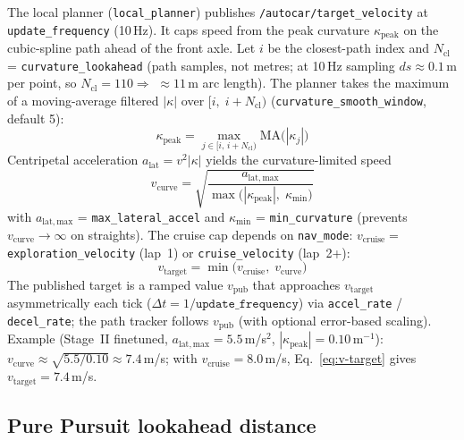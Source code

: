 \documentclass[11pt,a4paper]{article}
\begin{document}
The local planner (\texttt{local\_planner}) publishes
\texttt{/autocar/target\_velocity} at \texttt{update\_frequency} (10\,Hz).
It caps speed from the peak curvature $\kappa_{\mathrm{peak}}$ on the cubic-spline
path ahead of the front axle.
Let $i$ be the closest-path index and $N_{\mathrm{cl}}$ =
\texttt{curvature\_lookahead} (path samples, not metres; at 10\,Hz sampling
$ds \approx 0.1$\,m per point, so $N_{\mathrm{cl}} = 110 \Rightarrow$
${\approx}11$\,m arc length).
The planner takes the maximum of a moving-average filtered $|\kappa|$ over
$[i,\; i + N_{\mathrm{cl}})$ (\texttt{curvature\_smooth\_window}, default 5):
\begin{equation}
  \label{eq:kappa-peak}
  \kappa_{\mathrm{peak}}
  = \max_{j \in [i,\, i + N_{\mathrm{cl}})} \mathrm{MA}\bigl(|\kappa_j|\bigr)
\end{equation}
Centripetal acceleration $a_{\mathrm{lat}} = v^2 |\kappa|$ yields the
curvature-limited speed
\begin{equation}
  \label{eq:v-curve}
  v_{\mathrm{curve}}
  = \sqrt{\frac{a_{\mathrm{lat,max}}}
               {\max\bigl(|\kappa_{\mathrm{peak}}|,\; \kappa_{\min}\bigr)}}
\end{equation}
with $a_{\mathrm{lat,max}}$ = \texttt{max\_lateral\_accel} and
$\kappa_{\min}$ = \texttt{min\_curvature} (prevents $v_{\mathrm{curve}}
\to \infty$ on straights).
The cruise cap depends on \texttt{nav\_mode}:
$v_{\mathrm{cruise}} =$ \texttt{exploration\_velocity} (lap~1) or
\texttt{cruise\_velocity} (lap~2+):
\begin{equation}
  \label{eq:v-target}
  v_{\mathrm{target}} = \min\bigl(v_{\mathrm{cruise}},\; v_{\mathrm{curve}}\bigr)
\end{equation}
The published target is a ramped value $v_{\mathrm{pub}}$ that approaches
$v_{\mathrm{target}}$ asymmetrically each tick ($\Delta t = 1/\texttt{update\_frequency}$)
via \texttt{accel\_rate} / \texttt{decel\_rate}; the path tracker follows
$v_{\mathrm{pub}}$ (with optional error-based scaling).
Example (Stage~II finetuned, $a_{\mathrm{lat,max}} = 5.5$\,m/s$^2$,
$|\kappa_{\mathrm{peak}}| = 0.10$\,m$^{-1}$):
$v_{\mathrm{curve}} \approx \sqrt{5.5/0.10} \approx 7.4$\,m/s;
with $v_{\mathrm{cruise}} = 8.0$\,m/s, Eq.~\ref{eq:v-target} gives
$v_{\mathrm{target}} = 7.4$\,m/s.

\subsection{Pure Pursuit lookahead distance}
\label{sec:pp-lookahead}
\end{document}
